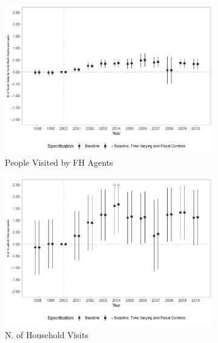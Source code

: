 \begin{figure}[h!]
\begin{center}
\begin{subfigure}{0.32\textwidth}
    \end{subfigure}
    \begin{subfigure}{0.32\textwidth}
        \centering
        \caption{\scriptsize People Visited by FH Agents}\label{fig:12c}
        \includegraphics[width=\textwidth]{plots/siab_accomp_especif_psf_pcapita_dist_ec29_baseline_dist_ec29_baseline_12.pdf}
    \end{subfigure}
        \begin{subfigure}{0.32\textwidth}
        \caption{\scriptsize N. of Household Visits}\label{fig:12d}
        \centering
        \includegraphics[width=\textwidth]{plots/siab_visit_cha_pcapita_dist_ec29_baseline_dist_ec29_baseline_12.pdf}
    \end{subfigure}
    \begin{subfigure}{0.32\textwidth}

\end{subfigure}
\end{center}
\end{figure}
